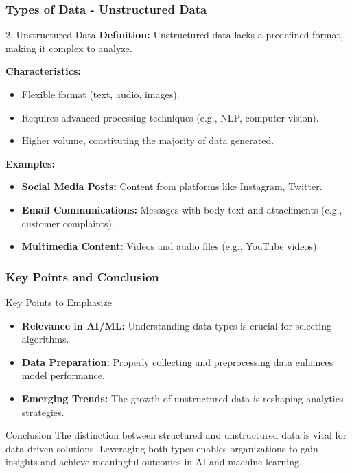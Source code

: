 \documentclass[aspectratio=169]{beamer}
\begin{document}
\begin{frame}[fragile]
    \frametitle{Types of Data - Unstructured Data}
    \begin{block}{2. Unstructured Data}
        \textbf{Definition:} 
        Unstructured data lacks a predefined format, making it complex to analyze.

        \textbf{Characteristics:}
        \begin{itemize}
            \item Flexible format (text, audio, images).
            \item Requires advanced processing techniques (e.g., NLP, computer vision).
            \item Higher volume, constituting the majority of data generated.
        \end{itemize}

        \textbf{Examples:}
        \begin{itemize}
            \item \textbf{Social Media Posts:} Content from platforms like Instagram, Twitter.
            \item \textbf{Email Communications:} Messages with body text and attachments (e.g., customer complaints).
            \item \textbf{Multimedia Content:} Videos and audio files (e.g., YouTube videos).
        \end{itemize}
    \end{block}
\end{frame}

\begin{frame}[fragile]
    \frametitle{Key Points and Conclusion}
    \begin{block}{Key Points to Emphasize}
        \begin{itemize}
            \item \textbf{Relevance in AI/ML:} Understanding data types is crucial for selecting algorithms.
            \item \textbf{Data Preparation:} Properly collecting and preprocessing data enhances model performance.
            \item \textbf{Emerging Trends:} The growth of unstructured data is reshaping analytics strategies.
        \end{itemize}
    \end{block}

    \begin{block}{Conclusion}
        The distinction between structured and unstructured data is vital for data-driven solutions. 
        Leveraging both types enables organizations to gain insights and achieve meaningful outcomes in AI and machine learning.
    \end{block}
\end{frame}
\end{document}
